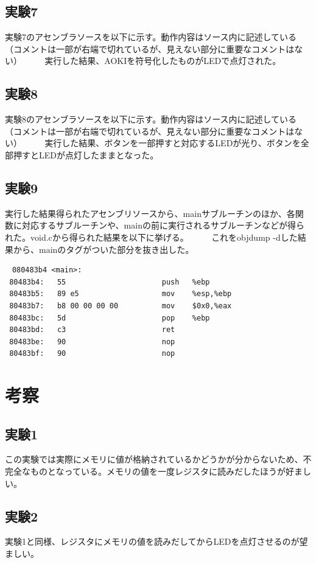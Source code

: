 \documentclass{jarticle}[2012/05/15]
\begin{document}
\subsection{実験7}
実験7のアセンブラソースを以下に示す。動作内容はソース内に記述している（コメントは一部が右端で切れているが、見えない部分に重要なコメントはない）
{\scriptsize
 　　
}
実行した結果、AOKIを符号化したものがLEDで点灯された。
\pagebreak
\subsection{実験8}
実験8のアセンブラソースを以下に示す。動作内容はソース内に記述している（コメントは一部が右端で切れているが、見えない部分に重要なコメントはない）
{\scriptsize
 　　
}
実行した結果、ボタンを一部押すと対応するLEDが光り、ボタンを全部押すとLEDが点灯したままとなった。
\pagebreak
\subsection{実験9}
実行した結果得られたアセンブリソースから、mainサブルーチンのほか、各関数に対応するサブルーチンや、mainの前に実行されるサブルーチンなどが得られた。void.cから得られた結果を以下に挙げる。
{\scriptsize
 　　
}
これをobjdump -dした結果から、mainのタグがついた部分を抜き出した。
\begin{lstlisting}[label=src:objdump, caption=objdumpの結果]
　080483b4 <main>:
 80483b4:	55                   	push   %ebp
 80483b5:	89 e5                	mov    %esp,%ebp
 80483b7:	b8 00 00 00 00       	mov    $0x0,%eax
 80483bc:	5d                   	pop    %ebp
 80483bd:	c3                   	ret    
 80483be:	90                   	nop
 80483bf:	90                   	nop
\end{lstlisting}

\section{考察}
\subsection{実験1}
この実験では実際にメモリに値が格納されているかどうかが分からないため、不完全なものとなっている。メモリの値を一度レジスタに読みだしたほうが好ましい。
\subsection{実験2}
実験1と同様、レジスタにメモリの値を読みだしてからLEDを点灯させるのが望ましい。
\end{document}

